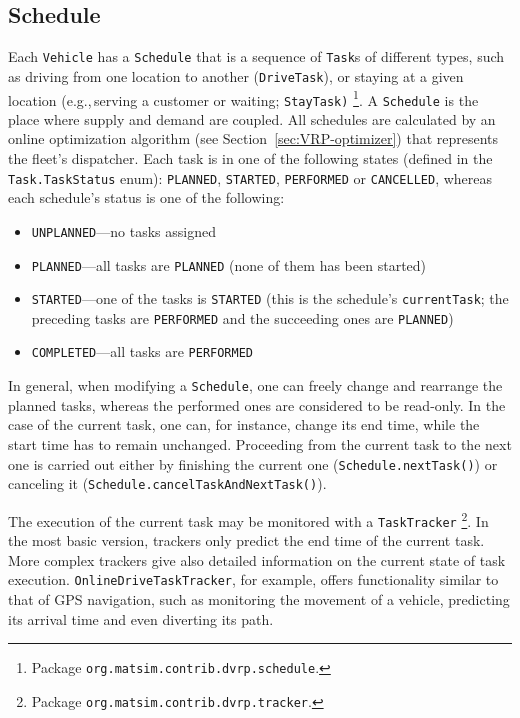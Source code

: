 \subsection{Schedule}
\label{sec:VRP-schedule}
Each \lstinline$Vehicle$ has a \lstinline$Schedule$ that is a sequence of \lstinline$Task$s of different types, such as driving from one location to another (\lstinline$DriveTask$), or staying at a given location (e.g.,\,serving a customer or waiting;  \lstinline$StayTask)$%
\footnote{
Package \lstinline$org.matsim.contrib.dvrp.schedule$.
}. A \lstinline$Schedule$ is the place where supply and demand are coupled. All schedules are calculated by an online optimization algorithm (see Section~\ref{sec:VRP-optimizer}) that represents the fleet's dispatcher. Each task is in one of the following states (defined in the \lstinline$Task.TaskStatus$ enum): \lstinline$PLANNED$, \lstinline$STARTED$, \lstinline$PERFORMED$ or \lstinline$CANCELLED$, whereas each schedule's status is one of the following:
%
\begin{itemize}
	\item \lstinline$UNPLANNED$---no tasks assigned
	
	\item \lstinline$PLANNED$---all tasks are \lstinline$PLANNED$ (none of them has been started)
	
	\item \lstinline$STARTED$---one of the tasks is \lstinline$STARTED$ (this is the schedule's \lstinline$currentTask$; the preceding tasks are \lstinline$PERFORMED$ and the succeeding ones are \lstinline$PLANNED$)
	
	\item \lstinline$COMPLETED$---all tasks are \lstinline$PERFORMED$
\end{itemize}
%
In general, when modifying a \lstinline$Schedule$, one can freely change and rearrange the planned tasks, whereas the performed ones are considered to be read-only. In the case of the current task, one can, for instance, change its end time, while the start time has to remain unchanged. Proceeding from the current task to the next one is carried out either by finishing the current one (\lstinline$Schedule.nextTask()$) or canceling it (\lstinline$Schedule.cancelTaskAndNextTask()$).

The execution of the current task may be monitored with a \lstinline$TaskTracker$%
\footnote{
Package \lstinline$org.matsim.contrib.dvrp.tracker$.
}.
In the most basic version, trackers only predict the end time of the current task. More complex trackers give also detailed information on the current state of task execution. \lstinline$OnlineDriveTaskTracker$, for example, offers functionality similar to that of GPS navigation, such as monitoring the movement of a vehicle, predicting its arrival time and even diverting its path.

